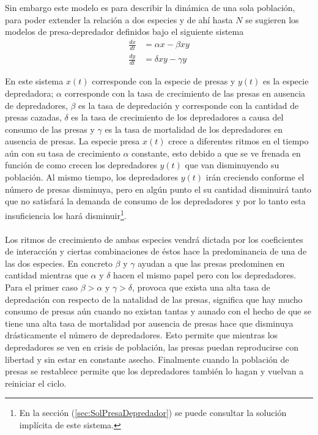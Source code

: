 \newpage
Sin embargo este modelo es para describir la dinámica de una sola población, para poder extender la relación a dos especies y de ahí hasta $N$ se sugieren los modelos de presa-depredador definidos bajo el siguiente sistema
\begin{equation}\label{eqn:PresaDepredador}
	\begin{split}
		\frac{dx}{dt} &= \alpha x - \beta xy\\
		\frac{dy}{dt} &= \delta xy -\gamma y
	\end{split}
\end{equation}

En este sistema $x(t)$ corresponde con la especie de presas y $y(t)$ es la especie depredadora; $\alpha$ corresponde con la tasa de crecimiento de las presas en ausencia de depredadores, $\beta$ es la tasa de depredación y corresponde con la cantidad de presas cazadas, $\delta$ es la tasa de crecimiento de los depredadores a causa del consumo de las presas y $\gamma$ es la tasa de mortalidad de los depredadores en ausencia de presas. La especie presa $x(t)$ crece a diferentes ritmos en el tiempo aún con su tasa de crecimiento $\alpha$ constante, esto debido a que se ve frenada en función de como crecen los depredadores $y(t)$ que van disminuyendo su población. Al mismo tiempo, los depredadores $y(t)$ irán creciendo conforme el número de presas disminuya, pero en algún punto el su cantidad disminuirá tanto que no satisfará la demanda de consumo de los depredadores y por lo tanto esta insuficiencia los hará disminuir\footnote{En la sección (\ref{sec:SolPresaDepredador}) se puede consultar la solución implícita de este sistema.}. \\
\\
Los ritmos de crecimiento de ambas especies vendrá dictada por los coeficientes de interacción y ciertas combinaciones de éstos hace la predominancia de una de las dos especies. En concreto $\beta$ y $\gamma$ ayudan a que las presas predominen en cantidad mientras que $\alpha$ y $\delta$ hacen el mismo papel pero con los depredadores. Para el primer caso $\beta >\alpha$ y $\gamma>\delta$, provoca que exista una alta tasa de depredación con respecto de la natalidad de las presas, significa que hay mucho consumo de presas aún cuando no existan tantas y aunado con el hecho de que se tiene una alta tasa de mortalidad por ausencia de presas hace que disminuya drásticamente el número de depredadores. Esto permite que mientras los depredadores se ven en crisis de población, las presas puedan reproducirse con libertad y sin estar en constante asecho. Finalmente cuando la población de presas se restablece permite que los depredadores también lo hagan y vuelvan a reiniciar el ciclo.
